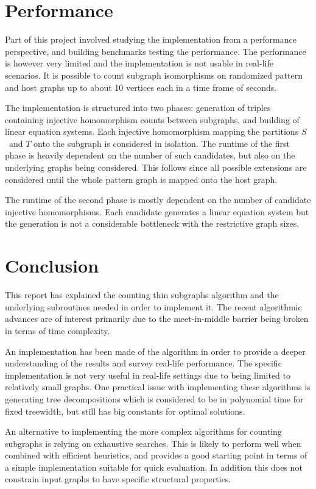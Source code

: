 \documentclass[a4paper,11pt]{report}
\theoremstyle{plain}
\theoremstyle{definition}
\begin{document}
\section{Performance}
Part of this project involved studying the implementation from a performance perspective, and building benchmarks testing the performance.
The performance is however very limited and the implementation is not usable in real-life scenarios.
It is possible to count subgraph isomorphisms on randomized pattern and host graphs up to about 10 vertices each in a time frame of seconds.

The implementation is structured into two phases: generation of triples containing injective homomorphism counts between subgraphs, and building of linear equation systems.
Each injective homomorphism mapping the partitions $S$ and $T$ onto the subgraph is considered in isolation.
The runtime of the first phase is heavily dependent on the number of such candidates, but also on the underlying graphs being considered.
This follows since all possible extensions are considered until the whole pattern graph is mapped onto the host graph.

The runtime of the second phase is mostly dependent on the number of candidate injective homomorphisms.
Each candidate generates a linear equation system but the generation is not a considerable bottleneck with the restrictive graph sizes.

\section{Conclusion}
This report has explained the counting thin subgraphs algorithm and the underlying subroutines needed in order to implement it.
The recent algorithmic advances are of interest primarily due to the meet-in-middle barrier being broken in terms of time complexity.

An implementation has been made of the algorithm in order to provide a deeper understanding of the results and survey real-life performance.
The specific implementation is not very useful in real-life settings due to being limited to relatively small graphs.
One practical issue with implementing these algorithms is generating tree decompositions which is considered to be in polynomial time for fixed treewidth, but still has big constants for optimal solutions.

An alternative to implementing the more complex algorithms for counting subgraphs is relying on exhaustive searches.
This is likely to perform well when combined with efficient heuristics, and provides a good starting point in terms of a simple implementation suitable for quick evaluation.
In addition this does not constrain input graphs to have specific structural properties.
\end{document}
